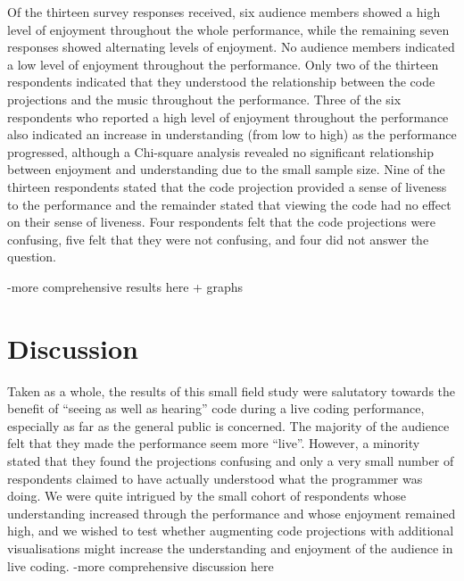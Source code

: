 Of the thirteen survey responses received, six audience members showed a high level of enjoyment throughout the whole performance, while the remaining seven responses showed alternating levels of enjoyment. No audience members indicated a low level of enjoyment throughout the performance.  Only two of the thirteen respondents indicated that they understood the relationship between the code projections and the music throughout the performance. Three of the six respondents who reported a high level of enjoyment throughout the performance also indicated an increase in understanding (from low to high) as the performance progressed, although a Chi-square analysis revealed no significant relationship between enjoyment and understanding due to the small sample size. Nine of the thirteen respondents stated that the code projection provided a sense of liveness to the performance and the remainder stated that viewing the code had no effect on their sense of liveness. Four respondents felt that the code projections were confusing, five felt that they were not confusing, and four did not answer the question.

-more comprehensive results here + graphs




\section{Discussion}

Taken as a whole, the results of this small field study were salutatory towards the benefit of ``seeing as well as hearing'' code during a live coding performance, especially as far as the general public is concerned. The majority of the audience felt that they made the performance seem more ``live''. However, a minority stated that they found the projections confusing and only a very small number of respondents claimed to have actually understood what the programmer was doing. We were quite intrigued by the small cohort of respondents whose understanding increased through the performance and whose enjoyment remained high, and we wished to test whether augmenting code projections with additional visualisations might increase the understanding and enjoyment of the audience in live coding. 
-more comprehensive discussion here
